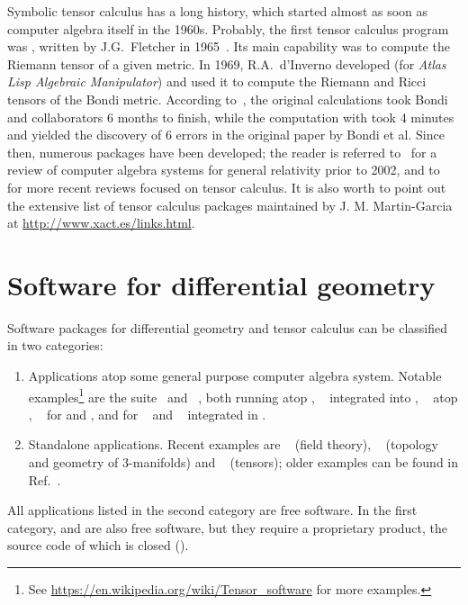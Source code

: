 Symbolic tensor calculus has a long history, which started
almost as soon as computer algebra itself in the 1960s.
Probably, the first tensor calculus program was , written by J.G.~Fletcher
in 1965~\cite{Fletc67}. Its main capability was to compute the Riemann tensor
of a given metric. In 1969, R.A.~d'Inverno developed 
(for \emph{Atlas Lisp Algebraic Manipulator}) and used it to compute
the Riemann and Ricci tensors of the Bondi metric.
According to~\cite{Skea94},
the original calculations took Bondi and collaborators 6 months to finish,
while the computation with  took 4 minutes and yielded the
discovery of 6 errors in the original paper by Bondi et al.
Since then, numerous packages have been developed; the reader is referred to~\cite{MacCa02}
for a review of computer algebra
systems for general relativity prior to 2002, and to~\cite{KorolKS13,BirkaGSC17} for more recent reviews
focused on tensor calculus.
It is also worth to point out the extensive list of
tensor calculus packages maintained by J. M. Martin-Garcia at
\url{http://www.xact.es/links.html}.


\section{Software for differential geometry}

Software packages for differential geometry and tensor calculus can be
classified in two categories:
\begin{enumerate}
\item Applications atop some general purpose computer algebra system.
Notable examples\footnote{See \url{https://en.wikipedia.org/wiki/Tensor_software}
for more examples.} are
the  suite~\cite{Marti08} and ~\cite{ricci}, both
running atop ,
~\cite{AnderT12} integrated into ,
~\cite{grtensorIII} atop , ~\cite{atlas2}
for  and ,  and  for ~\cite{Toth05}
and
~\cite{sagemanifolds} integrated in .
\item Standalone applications. Recent examples are ~\cite{Peete07} (field theory),
~\cite{snappy} (topology and geometry of 3-manifolds)  and
~\cite{BolotP13} (tensors); older examples can be found in
Ref.~\cite{MacCa02}.
\end{enumerate}
All applications listed in the second category are free software. In
the first category,  and  are also free software, but
they require a proprietary product, the source code of which is closed ().

